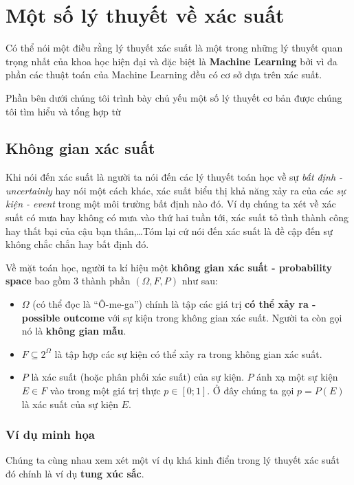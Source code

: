 \documentclass[../main-report.tex]{subfiles}
\begin{document}
\section{Một số lý thuyết về xác suất}
Có thể nói một điều rằng lý thuyết xác suất là một trong những lý thuyết quan trọng nhất của khoa học hiện đại và đặc biệt là \textbf{Machine Learning} bởi vì đa phần các thuật toán của Machine Learning đều có cơ sở dựa trên xác suất.

Phần bên dưới chúng tôi trình bày chủ yếu một số lý thuyết cơ bản được chúng tôi tìm hiểu và tổng hợp từ \citep{MLCB:xacsuat}
\subsection{Không gian xác suất}
Khi nói đến xác suất là người ta nói đến các lý thuyết toán học về sự \textit{bất định - uncertainly} hay nói một cách khác, xác suất biểu thị khả năng xảy ra của các \textit{sự kiện - event} trong một môi trường bất định nào đó. Ví dụ chúng ta xét về xác suất có mưa hay không có mưa vào thứ hai tuần tới, xác suất tỏ tình thành công hay thất bại của cậu bạn thân,\ldots Tóm lại cứ nói đến xác suất là đề cập đến sự không chắc chắn hay bất định đó.

Về mặt toán học, người ta kí hiệu một \textbf{không gian xác suất - probability space} bao gồm 3 thành phần $(\Omega, F, P)$ như sau:

\begin{itemize}
\item $\Omega$ (có thể đọc là ``Ô-me-ga'') chính là tập các giá trị \textbf{có thể xảy ra - possible outcome} với sự kiện trong không gian xác suất. Người ta còn gọi nó là \textbf{không gian mẫu}.
\item $F \subseteq 2^{\Omega}$ là tập hợp các sự kiện có thể xảy ra trong không gian xác suất.
\item $P$ là xác suất (hoặc phân phối xác suất) của sự kiện. $P$ ánh xạ một sự kiện $E \in F$ vào trong một giá trị thực $p \in \left [ 0;1 \right ]$. Ở đây chúng ta gọi $p = P(E)$ là xác suất của sự kiện $E$.
\end{itemize}

\subsubsection*{Ví dụ minh họa}
Chúng ta cùng nhau xem xét một ví dụ khá kinh điển trong lý thuyết xác suất đó chính là ví dụ \textbf{tung xúc sắc}.
\end{document}
